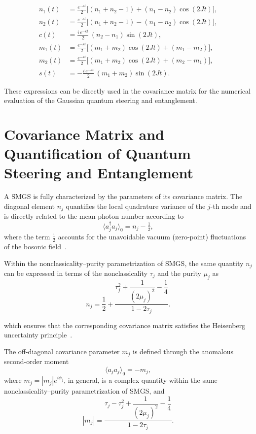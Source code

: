 \begin{align}
	n_1(t) &= \frac{e^{-\kappa t}}{2}\Big[(n_1+n_2-1) + (n_1-n_2)\cos(2Jt)\Big],\\[4pt]
	n_2(t) &= \frac{e^{-\kappa t}}{2}\Big[(n_1+n_2-1) - (n_1-n_2)\cos(2Jt)\Big],\\[4pt]
	c(t) &= \frac{i\,e^{-\kappa t}}{2}\,(n_2-n_1)\sin(2Jt),\\[6pt]
	m_1(t) &= \frac{e^{-\kappa t}}{2}\Big[(m_1+m_2)\cos(2Jt) + (m_1-m_2)\Big],\\[4pt]
	m_2(t) &= \frac{e^{-\kappa t}}{2}\Big[(m_1+m_2)\cos(2Jt) + (m_2-m_1)\Big],\\[4pt]
	s(t) &= -\frac{i\,e^{-\kappa t}}{2}\,(m_1+m_2)\sin(2Jt).
\end{align}


These expressions can be directly used in the covariance matrix for the numerical evaluation of the
Gaussian quantum steering and entanglement.
\section{Covariance Matrix and Quantification of Quantum Steering and Entanglement}
A SMGS is fully characterized by the parameters of its covariance matrix.
The diagonal element \(n_j\) quantifies the local quadrature variance of the \(j\)-th mode and is
directly related to the mean photon number according to
\begin{equation}
	\langle a_j^\dagger a_j \rangle_0 = n_j - \tfrac{1}{2},
\end{equation}
where the term \(\tfrac{1}{2}\) accounts for the unavoidable vacuum (zero-point) fluctuations of the
bosonic field~\cite{Weedbrook2012}.

Within the nonclassicality–purity parametrization of SMGS, the same quantity \(n_j\) can be expressed in
terms of the nonclassicality \(\tau_j\) and the purity \(\mu_j\) as~\cite{Rong2006}
\begin{equation}
	n_j
	=
	\frac{1}{2}
	+
	\frac{
		\tau_j^{2}
		+
		\dfrac{1}{(2\mu_j)^{2}}
		-
		\dfrac{1}{4}
	}{
		1 - 2\tau_j
	}.
\end{equation}

which ensures that the corresponding covariance matrix satisfies the Heisenberg uncertainty
principle~\cite{Weedbrook2012}.

The off-diagonal covariance parameter \(m_j\) is defined through the anomalous second-order moment
\begin{equation}
	\langle a_j a_j \rangle_0 = - m_j ,
\end{equation}
where \(m_j = |m_j| e^{i\phi_j}\), in general, is a complex quantity within the same
nonclassicality–purity parametrization of SMGS, and
\begin{equation}
	|m_j|
	=
	\frac{
		\tau_j
		-
		\tau_j^{2}
		+
		\dfrac{1}{(2\mu_j)^{2}}
		-
		\dfrac{1}{4}
	}{
		1 - 2\tau_j
	}.
\end{equation}


